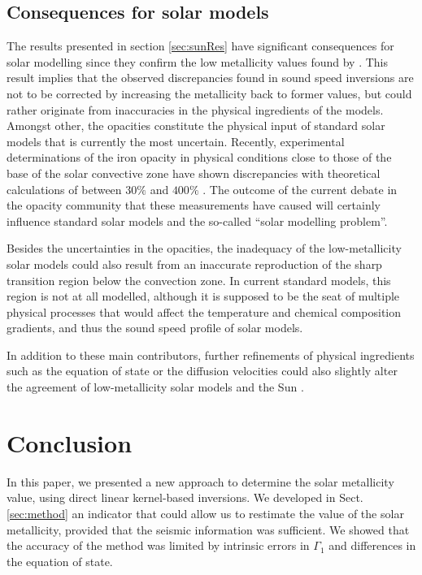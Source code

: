 \documentclass[a4paper,fleqn,usenatbib]{mnras}
\begin{document}
\subsection{Consequences for solar models} \label{sec:Disc}

The results presented in section \ref{sec:sunRes} have significant consequences for solar modelling since they confirm the low metallicity values found by \citet{Vorontsov}. This result implies that the observed discrepancies found in sound speed inversions \citep[e.g.][]{SerenelliComp} are not to be corrected by increasing the metallicity back to former values, but could rather originate from inaccuracies in the physical ingredients of the models. Amongst other, the opacities constitute the physical input of standard solar models that is currently the most uncertain. Recently, experimental determinations of the iron opacity in physical conditions close to those of the base of the solar convective zone have shown discrepancies with theoretical calculations of between $30 \%$ and $400 \%$ \citep{Bailey}. The outcome of the current debate \citep[see for example][amongst others]{Nahar, BlancardComment, IglesiasIron} in the opacity community that these measurements have caused will certainly influence standard solar models and the so-called ``solar modelling problem''.


Besides the uncertainties in the opacities, the inadequacy of the low-metallicity solar models could also result from an inaccurate reproduction of the sharp transition region below the convection zone. In current standard models, this region is not at all modelled, although it is supposed to be the seat of multiple physical processes \citep[see][for a thorough review]{Hughes2007} that would affect the temperature and chemical composition gradients, and thus the sound speed profile of solar models.


In addition to these main contributors, further refinements of physical ingredients such as the equation of state \citep[see for example][for recent studies]{BaturinSAHA,Vorontsov13} or the diffusion velocities could also slightly alter the agreement of low-metallicity solar models and the Sun \citep[see for example][for a study of the effects of diffusion]{Turcotte1998}.

\section{Conclusion} \label{sec:Conc}

In this paper, we presented a new approach to determine the solar metallicity value, using direct linear kernel-based inversions. We developed in Sect. \ref{sec:method} an indicator that could allow us to restimate the value of the solar metallicity, provided that the seismic information was sufficient. We showed that the accuracy of the method was limited by intrinsic errors in $\Gamma_{1}$ and differences in the equation of state.
\end{document}
